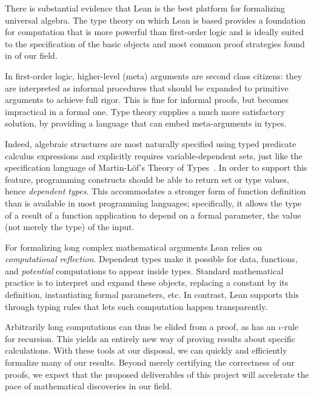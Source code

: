 \documentclass[11pt]{amsart}  %
\begin{document}
There is substantial evidence that Lean is the best platform for formalizing universal algebra.  The type theory on which Lean is based provides a foundation for computation that is more powerful than first-order logic and is ideally suited to the specification of the basic objects and most common proof strategies found in of our field.

In first-order logic, higher-level (meta) arguments are second class citizens:
they are interpreted as informal procedures that should be expanded to primitive
arguments to achieve full rigor. This is fine for informal proofs, but becomes
impractical in a formal one. Type theory supplies a much more satisfactory
solution, by providing a language that can embed meta-arguments in types. 

Indeed, algebraic structures are most naturally specified using typed predicate calculus expressions and explicitly requires variable-dependent sets, just like the specification language of Martin-L\"{o}f's Theory of Types~\cite{MR769301}.
In order to support this feature, programming constructs should be able to return set or type values, hence \emph{dependent types}. This accommodates a stronger form of function definition than is available in most programming languages; specifically, it allows the type of a result of a function application to depend on a formal parameter, the value (not merely the
type) of the input.

For formalizing long complex mathematical arguments Lean relies on \emph{computational reflection}. Dependent types make it possible for data, functions, and \emph{potential} computations to appear inside types. Standard mathematical practice is to interpret and expand these objects, replacing a constant by its definition, instantiating formal parameters, etc. In contrast, Lean supports this through typing rules that lets such computation happen transparently. 


Arbitrarily long computations can thus be elided from a proof, as \cic has an $\iota$-rule for recursion. This yields an entirely new way of proving
results about specific calculations. With these tools at our disposal, we can quickly and efficiently formalize many of our results. Beyond merely certifying the correctness of our proofs, we expect that the proposed deliverables of this project will accelerate the pace of mathematical discoveries in our field.
\end{document}
